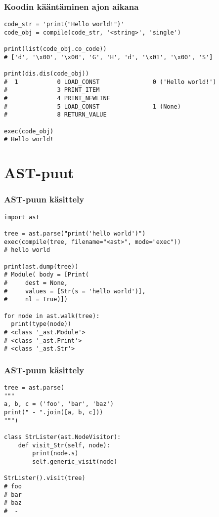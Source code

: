 \documentclass{beamer}
\begin{document}
\begin{frame}[fragile]
\frametitle{Koodin kääntäminen ajon aikana}
\begin{verbatim}
code_str = 'print("Hello world!")'
code_obj = compile(code_str, '<string>', 'single')

print(list(code_obj.co_code))
# ['d', '\x00', '\x00', 'G', 'H', 'd', '\x01', '\x00', 'S']

print(dis.dis(code_obj))
#  1           0 LOAD_CONST               0 ('Hello world!')
#              3 PRINT_ITEM          
#              4 PRINT_NEWLINE       
#              5 LOAD_CONST               1 (None)
#              8 RETURN_VALUE        

exec(code_obj)
# Hello world!
\end{verbatim}
\end{frame}


\section{AST-puut}


\begin{frame}[fragile]
\frametitle{AST-puun käsittely}
\begin{verbatim}
import ast

tree = ast.parse("print('hello world')")
exec(compile(tree, filename="<ast>", mode="exec"))
# hello world

print(ast.dump(tree))
# Module( body = [Print(
#     dest = None, 
#     values = [Str(s = 'hello world')], 
#     nl = True)])

for node in ast.walk(tree):
  print(type(node))
# <class '_ast.Module'>
# <class '_ast.Print'>
# <class '_ast.Str'>

\end{verbatim}
\end{frame}


\begin{frame}[fragile]
\frametitle{AST-puun käsittely}
\begin{verbatim}
tree = ast.parse(
"""
a, b, c = ('foo', 'bar', 'baz')
print(" - ".join([a, b, c]))
""")

class StrLister(ast.NodeVisitor):
    def visit_Str(self, node):
        print(node.s)
        self.generic_visit(node)

StrLister().visit(tree)
# foo
# bar
# baz
#  - 
\end{verbatim}
\end{frame}
\end{document}
